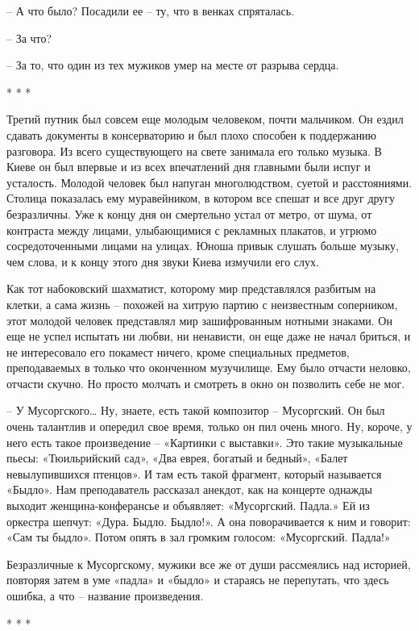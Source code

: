 – А что было? Посадили ее – ту, что в венках спряталась.

– За что?

– За то, что один из тех мужиков умер на месте от разрыва сердца.

* * *

Третий путник был совсем еще молодым человеком, почти мальчиком. Он ездил сдавать документы в консерваторию и был плохо способен к поддержанию разговора. Из всего существующего на свете занимала его только музыка. В Киеве он был впервые и из всех впечатлений дня главными были испуг и усталость. Молодой человек был напуган многолюдством, суетой и расстояниями. Столица показалась ему муравейником, в котором все спешат и все друг другу безразличны. Уже к концу дня он смертельно устал от метро, от шума, от контраста между лицами, улыбающимися с рекламных плакатов, и угрюмо сосредоточенными лицами на улицах. Юноша привык слушать больше музыку, чем слова, и к концу этого дня звуки Киева измучили его слух.

Как тот набоковский шахматист, которому мир представлялся разбитым на клетки, а сама жизнь – похожей на хитрую партию с неизвестным соперником, этот молодой человек представлял мир зашифрованным нотными знаками. Он еще не успел испытать ни любви, ни ненависти, он еще даже не начал бриться, и не интересовало его покамест ничего, кроме специальных предметов, преподаваемых в только что оконченном музучилище. Ему было отчасти неловко, отчасти скучно. Но просто молчать и смотреть в окно он позволить себе не мог.

– У Мусоргского… Ну, знаете, есть такой композитор – Мусоргский. Он был очень талантлив и опередил свое время, только он пил очень много. Ну, короче, у него есть такое произведение – «Картинки с выставки». Это такие музыкальные пьесы: «Тюильрийский сад», «Два еврея, богатый и бедный», «Балет невылупившихся птенцов». И там есть такой фрагмент, который называется «Быдло». Нам преподаватель рассказал анекдот, как на концерте однажды выходит женщина-конферансье и объявляет: «Мусоргский. Падла.» Ей из оркестра шепчут: «Дура. Быдло. Быдло!». А она поворачивается к ним и говорит: «Сам ты быдло». Потом опять в зал громким голосом: «Мусоргский. Падла!»

Безразличные к Мусоргскому, мужики все же от души рассмеялись над историей, повторяя затем в уме «падла» и «быдло» и стараясь не перепутать, что здесь ошибка, а что – название произведения.

* * *

